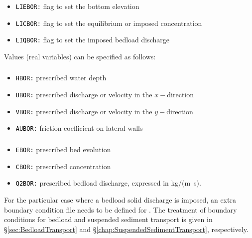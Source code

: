 \subsubsection{\gaia{}}
\begin{itemize}
\item \texttt{\textcolor{black}{LIEBOR:}} flag to set the bottom elevation
\item \texttt{\textcolor{black}{LICBOR:}} flag to set the equilibrium or imposed concentration
  \item \texttt{\textcolor{black}{LIQBOR:}} flag to set the imposed bedload discharge
\end{itemize}

Values (real variables) can be specified as follows:
\subsubsection{}
\begin{itemize}
\item \texttt{\textcolor{black}{HBOR:}} prescribed water depth
\item \texttt{\textcolor{black}{UBOR:}} prescribed discharge or velocity in the $x-$direction
\item \texttt{\textcolor{black}{VBOR:}} prescribed discharge or velocity in the $y-$direction
\item \texttt{\textcolor{black}{AUBOR:}} friction coefficient on lateral walls
\end{itemize}
\subsubsection{\gaia{}}
\begin{itemize}
\item \texttt{\textcolor{black}{EBOR:}} prescribed bed evolution
\item \texttt{\textcolor{black}{CBOR:}} prescribed concentration
\item \texttt{\textcolor{black}{Q2BOR:}} prescribed bedload discharge, expressed in kg/(m~s).
\end{itemize}

For the particular case where a bedload solid discharge is imposed, an extra boundary condition file needs to be defined for \gaia{}. The treatment of boundary conditions for bedload and suspended sediment transport is given in \S\ref{sec:BedloadTransport} and \S\ref{chap:SuspendedSedimentTransport}, respectively.

